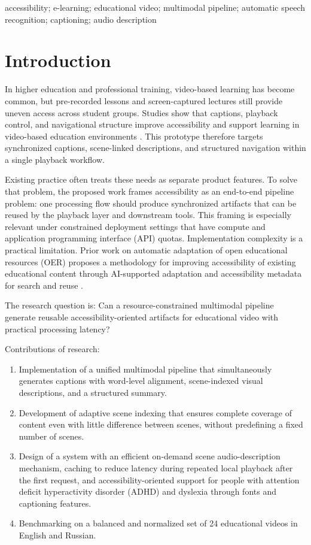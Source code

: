 ﻿\documentclass[conference]{IEEEtran}
\begin{document}
\begin{IEEEkeywords}
accessibility; e-learning; educational video; multimodal pipeline; automatic speech recognition; captioning; audio description
\end{IEEEkeywords}

\section{Introduction}
In higher education and professional training, video-based learning has become common, but pre-recorded lessons and screen-captured lectures still provide uneven access across student groups. Studies show that captions, playback control, and navigational structure improve accessibility and support learning in video-based education environments \cite{Gernsbacher2015,Mayer2020,Horlin2024}. This prototype therefore targets synchronized captions, scene-linked descriptions, and structured navigation within a single playback workflow.

Existing practice often treats these needs as separate product features. To solve that problem, the proposed work frames accessibility as an end-to-end pipeline problem: one processing flow should produce synchronized artifacts that can be reused by the playback layer and downstream tools. This framing is especially relevant under constrained deployment settings that have compute and application programming interface (API) quotas. Implementation complexity is a practical limitation. Prior work on automatic adaptation of open educational resources (OER) proposes a methodology for improving accessibility of existing educational content through AI-supported adaptation and accessibility metadata for search and reuse \cite{IngavelezGuerra2022}.

The research question is: Can a resource-constrained multimodal pipeline generate reusable accessibility-oriented artifacts for educational video with practical processing latency?

Contributions of research:
\begin{enumerate}
\item Implementation of a unified multimodal pipeline that simultaneously generates captions with word-level alignment, scene-indexed visual descriptions, and a structured summary.
\item Development of adaptive scene indexing that ensures complete coverage of content even with little difference between scenes, without predefining a fixed number of scenes.
\item Design of a system with an efficient on-demand scene audio-description mechanism, caching to reduce latency during repeated local playback after the first request, and accessibility-oriented support for people with attention deficit hyperactivity disorder (ADHD) and dyslexia through fonts and captioning features.
\item Benchmarking on a balanced and normalized set of 24 educational videos in English and Russian.
\end{enumerate}
\end{document}
